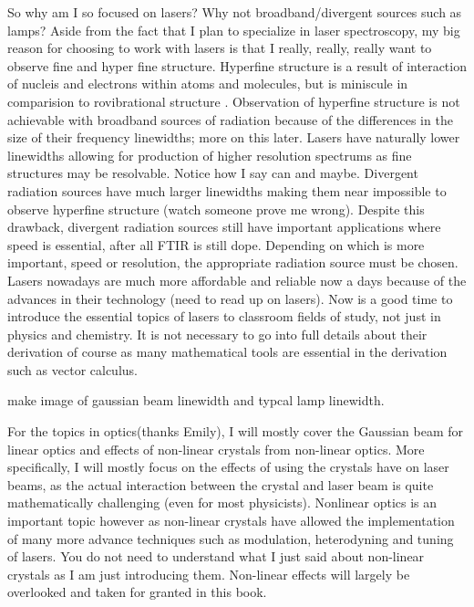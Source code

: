 \documentclass[a4paper]{book}
\begin{document}
	So why am I so focused on lasers? Why not broadband/divergent sources such as lamps? Aside from the fact that I plan to specialize in laser spectroscopy, my big reason for choosing to work with lasers is that I really, really, really want to observe fine and hyper fine structure. Hyperfine structure is a result of interaction of nucleis and electrons within atoms and molecules, but is miniscule in comparision to rovibrational structure . Observation of hyperfine structure is not achievable with broadband sources of radiation because of the differences in the size of their frequency linewidths; more on this later. Lasers have naturally lower linewidths allowing for production of higher resolution spectrums as fine structures may be resolvable. Notice how I say can and maybe. Divergent radiation sources have much larger linewidths making them near impossible to observe hyperfine structure (watch someone prove me wrong). Despite this drawback, divergent radiation sources still have important applications where speed is essential, after all FTIR is still dope. Depending on which is more important, speed or resolution, the appropriate radiation source must be chosen. Lasers nowadays are much more affordable and reliable now a days because of the advances in their technology (need to read up on lasers). Now is a good time to introduce the essential topics of lasers to classroom fields of study, not just in physics and chemistry. It is not necessary to go into full details about their derivation of course as many mathematical tools are essential in the derivation such as vector calculus.
	
	make image of gaussian beam linewidth and typcal lamp linewidth.
	
	For the topics in optics(thanks Emily), I will mostly cover the Gaussian beam for linear optics and effects of non-linear crystals from non-linear optics. More specifically, I will mostly focus on the effects of using the crystals have on laser beams, as the actual interaction between the crystal and laser beam is quite mathematically challenging (even for most physicists). Nonlinear optics is an important topic however as non-linear crystals have allowed the implementation of many more advance techniques such as modulation, heterodyning and tuning of lasers. You do not need to understand what I just said about non-linear crystals as I am just introducing them. Non-linear effects will largely be overlooked and taken for granted in this book. 
	
\end{document}
